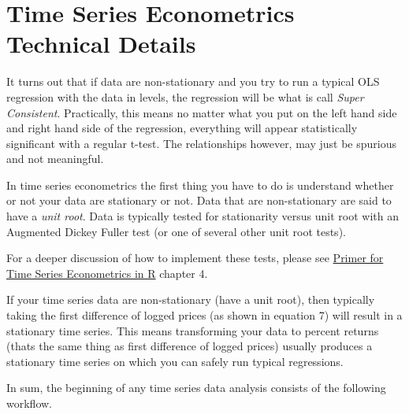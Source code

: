 \documentclass[
  letterpaper,
  DIV=11,
  numbers=noendperiod]{scrreprt}
\begin{document}
\hypertarget{time-series-econometrics-technical-details}{%
\section{Time Series Econometrics Technical
Details}\label{time-series-econometrics-technical-details}}

It turns out that if data are non-stationary and you try to run a
typical OLS regression with the data in levels, the regression will be
what is call \emph{Super Consistent}. Practically, this means no matter
what you put on the left hand side and right hand side of the
regression, everything will appear statistically significant with a
regular t-test. The relationships however, may just be spurious and not
meaningful.

In time series econometrics the first thing you have to do is understand
whether or not your data are stationary or not. Data that are
non-stationary are said to have a \emph{unit root}. Data is typically
tested for stationarity versus unit root with an Augmented Dickey Fuller
test (or one of several other unit root tests).

For a deeper discussion of how to implement these tests, please see
\href{http://mindymallory.com/R-Companion-Price-Analysis/}{Primer for
Time Series Econometrics in R} chapter 4.

If your time series data are non-stationary (have a unit root), then
typically taking the first difference of logged prices (as shown in
equation 7) will result in a stationary time series. This means
transforming your data to percent returns (thats the same thing as first
difference of logged prices) usually produces a stationary time series
on which you can safely run typical regressions.

In sum, the beginning of any time series data analysis consists of the
following workflow.
\end{document}
